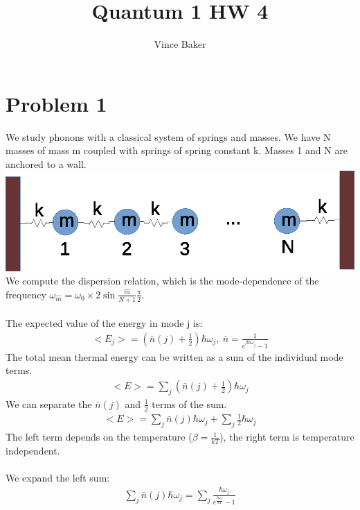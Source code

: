 \documentclass[a4paper,10pt]{article}
\title{Quantum 1 HW 4}
\author{Vince Baker}
\numberwithin{equation}{section}
\begin{document}
\maketitle

\section{Problem 1}
We study phonons with a classical system of springs and masses. 
We have N masses of mass m coupled with springs of spring constant k.
Masses 1 and N are anchored to a wall.\\
\includegraphics{p1}
\\
We compute the dispersion relation, which is the mode-dependence of the frequency $\omega_{\hat{m}}=\omega_0\times2\sin{\frac{\hat{m}}{N+1}\frac{\pi}{2}}$.
\\ \\
The expected value of the energy in mode j is:
\begin{gather}
 <E_j>=(\bar{n}(j)+\frac{1}{2})\hbar \omega_j,\ \bar{n}=\frac{1}{e^{\beta\hbar \omega_j}-1}
\end{gather}
The total mean thermal energy can be written as a sum of the individual mode terms.
\begin{gather}
 <E>=\sum_j(\bar{n}(j)+\frac{1}{2})\hbar \omega_j
\end{gather}
We can separate the $\bar{n}(j)$ and $\frac{1}{2}$ terms of the sum.
\begin{gather}
 <E>=\sum_j\bar{n}(j)\hbar \omega_j+\sum_j \frac{1}{2}\hbar \omega_j
\end{gather}
The left term depends on the temperature ($\beta=\frac{1}{kT}$), the right term is temperature independent.\\ \\
We expand the left sum:
\begin{gather}
 \sum_j\bar{n}(j)\hbar \omega_j=\sum_j \frac{\hbar \omega_j}{e^{\frac{\hbar \omega_j}{kT}}-1}
\end{gather}
\end{document}
